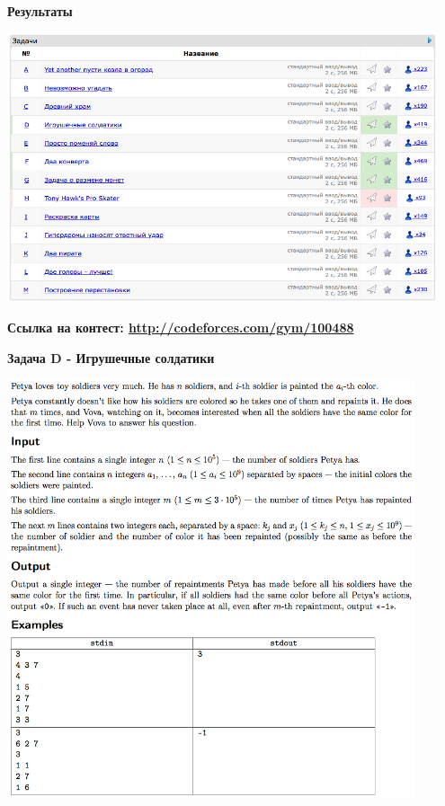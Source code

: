 \documentclass[a4paper,12pt]{article}
\begin{document}
\textbf{{\large Результаты}} \\
\begin{center}
\includegraphics[width=0.95\textwidth]{CT_SGAU/CT_SGAU_result.png}\\ [1cm]
\end{center}

\textbf{{\large Ссылка на контест: \url{http://codeforces.com/gym/100488}}}

\newpage
\textbf{{\large Задача D - Игрушечные солдатики}}

\begin{center}
\includegraphics[width=0.9\textwidth]{CT_SGAU/CT_SGAU_D.png}\\ [1cm]
\end{center}
\end{document}
